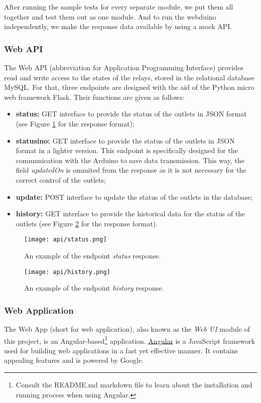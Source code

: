 After running the sample tests for every separate module, we put them all together and test them out as one module. And to run the webduino independently, we make the response data available by using a mock API.

\subsubsection{Web API}

The Web API (abbreviation for Application Programming Interface) provides read
and write access to the states of the relays, stored in the relational
database MySQL. For that, three endpoints are designed with the aid of the
Python micro web framework Flask. Their functions are given as follows:

\begin{itemize}
    \item \textbf{status:} GET interface to provide the status of the outlets in
    JSON format (see Figure \ref{fig:api-status} for the response format);
    \item \textbf{statusino:} GET interface to provide the status of the outlets
    in JSON format in a lighter version. This endpoint is specifically designed
    for the communication with the Arduino to save data transmission.
    This way, the field \textit{updatedOn} is ommited from the response as it is
    not necessary for the correct control of the outlets;
    \item \textbf{update:} POST interface to update the status of the outlets in
    the database;
    \item \textbf{history:} GET interface to provide the historical data for the
    status of the outlets (see Figure \ref{fig:api-history} for the response format).
\end{itemize}

\begin{figure}[h!]
    \centering
    \texttt{[image: api/status.png]}
    \caption{An example of the endpoint \textit{status} response.}
    \label{fig:api-status}
\end{figure}

\begin{figure}[h!]
    \centering
    \texttt{[image: api/history.png]}
    \caption{An example of the endpoint \textit{history} response.}
    \label{fig:api-history}
\end{figure}

\subsubsection{Web Application}
The Web App (short for web application), also known as the \emph{Web UI} module
of this project, is an Angular-based\footnote{Consult the README.md markdown
file to learn about the installation and running process when using Angular.}
application. \href{https://angular.io}{Angular} is a JavaScript framework used
for building web applications in a fast yet effective manner. It contains
appealing features and is powered by Google.

